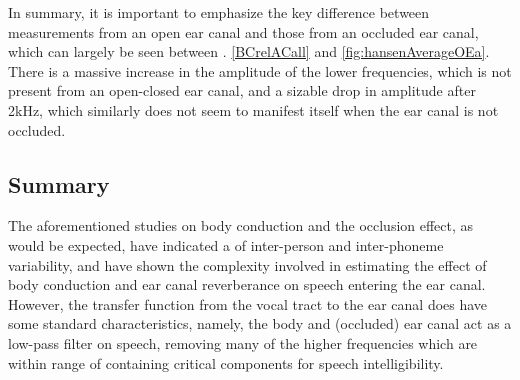 In summary, it is important to emphasize the key difference between measurements from an open ear canal and those from an occluded ear canal, which can largely be seen between \DIFdelbegin {}\DIFdelend \DIFaddbegin {}\DIFaddend . \ref{BCrelACall} and \ref{fig:hansenAverageOEa}.  There is a massive increase in the amplitude of the lower frequencies, which is not present from an open-closed ear canal, and a sizable drop in amplitude after 2kHz, which similarly does not seem to manifest itself when the ear canal is not occluded.


\subsection{Summary}

The aforementioned studies on body conduction and the occlusion effect, as would be expected, have indicated a \DIFdelbegin {}\DIFdelend \DIFaddbegin {}\DIFaddend of inter-person and inter-phoneme variability, and have shown the complexity involved in estimating the effect of body conduction and ear canal reverberance on speech entering the ear canal.  However, the transfer function from the vocal tract to the ear canal does have some standard characteristics, namely, the body and (occluded) ear canal act as a low-pass filter on speech, removing many of the higher frequencies which are within range of containing critical components for speech intelligibility.




